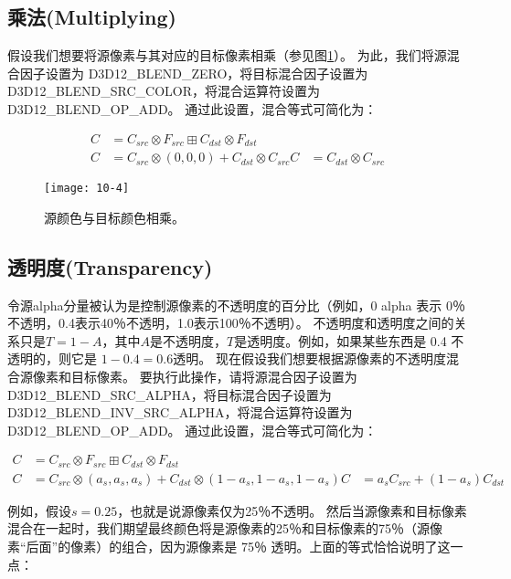 \subsection{乘法(Multiplying)}
\begin{flushleft}
假设我们想要将源像素与其对应的目标像素相乘（参见图\ref{fig:10-4}）。 为此，我们将源混合因子设置为 D3D12\_BLEND\_ZERO，将目标混合因子设置为D3D12\_BLEND\_SRC\_COLOR，将混合运算符设置为D3D12\_BLEND\_OP\_ADD。 通过此设置，混合等式可简化为：\\
\end{flushleft}

\begin{align*}
C&=C_{src}\otimes F_{src}\boxplus C_{dst}\otimes F_{dst}\\
C&=C_{src}\otimes (0,0,0)+C_{dst}\otimes C_{src}
C&=C_{dst}\otimes C_{src}
\end{align*}

\begin{figure}[h]
    \texttt{[image: 10-4]}
    \centering
    \caption{源颜色与目标颜色相乘。}
    \label{fig:10-4}
\end{figure}

\subsection{透明度(Transparency)}
\begin{flushleft}
令源alpha分量被认为是控制源像素的不透明度的百分比（例如，0 alpha 表示 0％不透明，0.4表示40％不透明，1.0表示100％不透明）。 不透明度和透明度之间的关系只是$T=1-A$，其中$A$是不透明度，$T$是透明度。例如，如果某些东西是 0.4 不透明的，则它是 $1-0.4=0.6$透明。 现在假设我们想要根据源像素的不透明度混合源像素和目标像素。 要执行此操作，请将源混合因子设置为 D3D12\_BLEND\_SRC\_ALPHA，将目标混合因子设置为 D3D12\_BLEND\_INV\_SRC\_ALPHA，将混合运算符设置为 D3D12\_BLEND\_OP\_ADD。 通过此设置，混合等式可简化为：\\
\end{flushleft}

\begin{align*}
C&=C_{src}\otimes F_{src}\boxplus C_{dst}\otimes F_{dst}\\
C&=C_{src}\otimes (a_{s},a_{s},a_{s})+C_{dst}\otimes (1-a_{s},1-a_{s},1-a_{s})
C&=a_{s}C_{src}+(1-a_{s})C_{dst}
\end{align*}

\begin{flushleft}
例如，假设$s=0.25$，也就是说源像素仅为25％不透明。 然后当源像素和目标像素混合在一起时，我们期望最终颜色将是源像素的25％和目标像素的75％（源像素“后面”的像素）的组合，因为源像素是 75％ 透明。上面的等式恰恰说明了这一点：\\
\end{flushleft}

